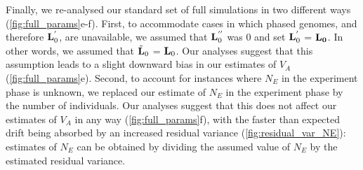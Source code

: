 \documentclass[12pt]{article}
\begin{document}
\begin{bibunit}
Finally, we re-analysed our standard set of full simulations in two different ways (\ref{fig:full_params}e-f). First, to accommodate cases in which phased genomes, and therefore ${\bf L}^{'}_{0}$, are unavailable, we assumed that ${\bf L}^{''}_{0}$ was 0 and set ${\bf L}^{'}_{0}$ = $\bf L_0$. In other words, we assumed that $\tilde{\bf L}_0$ = ${\bf L}_0$. Our analyses suggest that this assumption leads to a slight downward bias in our estimates of $V_A$ (\ref{fig:full_params}e). Second, to account for instances where $N_E$ in the experiment phase is unknown, we replaced our estimate of $N_E$ in the experiment phase by the number of individuals. Our analyses suggest that this does not affect our estimates of $V_A$ in any way (\ref{fig:full_params}f), with the faster than expected drift being absorbed by an increased residual variance (\ref{fig:residual_var_NE}): estimates of $N_E$ can be obtained by dividing the assumed value of $N_E$ by the estimated residual variance. 


\end{bibunit}
\end{document}
